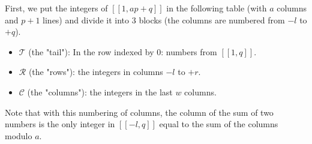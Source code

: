 First, we put the integers of \([\![1, ap + q]\!]\) in the following table (with \(a\) columns and \(p + 1\) lines)
and divide it into 3 blocks (the columns are numbered from \(-l\) to \(+q\)).

\begin{itemize}
	\item \(\mathcal{T}\) (the "tail"): In the row indexed by 0: numbers from \([\![1,q]\!]\).
	\item \(\mathcal{R}\) (the "rows"): the integers in columns \(-l\) to \(+r\).
	\item \(\mathcal{C}\) (the "columns"): the integers in the last \(w\) columns.
\end{itemize}

Note that with this numbering of columns, the column of the sum of two numbers is the only integer in \([\![-l,q]\!]\) equal to the
sum of the columns modulo \(a\).

\renewcommand{\arraystretch}{1.7}
\setlength{\arraycolsep}{3pt}

